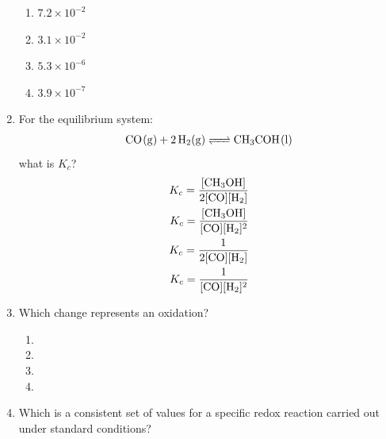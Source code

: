 \documentclass[11pt, leqno]{article}
\begin{document}
\begin{enumerate}[leftmargin = *]
\begin{enumerate}
    \item $7.2 \times 10 ^{-2}$
    \item $3.1\times 10^{-2}$
    \item $5.3 \times 10^{-6}$
    \item $3.9 \times 10^{-7}$
\end{enumerate}
\item For the equilibrium system:
\begin{align*}
    \ce{CO(g) + 2H2(g) <=> CH3COH(l)}
\end{align*}
what is $K_c$?
\begin{align}
K_c = \frac{[\ce{CH3OH}]}{2[\ce{CO}][\ce{H2}]} \\
K_c = \frac{[\ce{CH3OH}]}{[\ce{CO}][\ce{H2}]^2} \\
K_c = \frac{1}{2[\ce{CO}][\ce{H2}]} \\
K_c = \frac{1}{[\ce{CO}][\ce{H2}]^2} 
\end{align}
\item Which change represents an oxidation?
\begin{enumerate}
    \item {}
    \item {}
    \item {}
    \item {}
\end{enumerate}
\item Which is a consistent set of values for a specific redox reaction carried out under standard conditions?


\end{enumerate}
\end{document}
